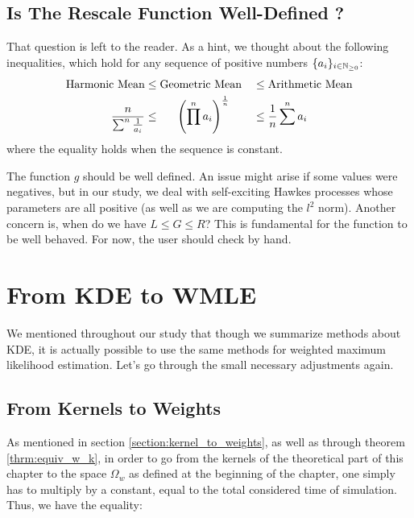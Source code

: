 \documentclass[11pt]{book}
\newcommand{\sequence}[1]{\{ #1 \}_{ i \in \N} }
\begin{document}
\subsection{Is The Rescale Function Well-Defined ?}
\label{subsection:self-defin}



That question is left to the reader. As a hint, we thought about the following inequalities, which hold for any sequence of positive numbers $\sequence{a_i}$:
\begin{alignat}{2}
\text{Harmonic Mean} 
&\leq \text{Geometric Mean} 
&& \leq \text{Arithmetic Mean} \notag \\
\frac n {\sum^n \frac 1 {a_i} } 
& \leq \hspace{0.55 cm} \left ( \prod^n a_i \right ) ^{ \frac 1 n } 
&& \leq \frac 1 n \sum^n a_i \notag
\end{alignat}
where the equality holds when the sequence is constant.

The function $g$ should be well defined. An issue might arise if some values were negatives, but in our study, we deal with self-exciting Hawkes processes whose parameters are all positive (as well as we are computing the $l^2$ norm). Another concern is, when do we have $L \leq G \leq R$? This is fundamental for the function to be well behaved. For now, the user should check by hand.





















\section{From KDE to WMLE}

We mentioned throughout our study that though we summarize methods about KDE, it is actually possible to use the same methods for weighted maximum likelihood estimation. Let's go through the small necessary adjustments again.

\subsection{From Kernels to Weights}
As mentioned in section \ref{section:kernel_to_weights}, as well as through theorem \ref{thrm:equiv_w_k}, in order to go from the kernels of the theoretical part of this chapter to the space $\Omega_w$ as defined at the beginning of the chapter, one simply has to multiply by a constant, equal to the total considered time of simulation. Thus, we have the equality:
\end{document}
